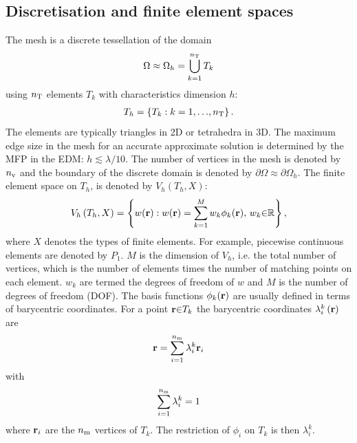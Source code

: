 \documentclass[a4paper]{article}
\numberwithin{equation}{section}
\begin{document}
\subsection[Discretisation and finite element spaces]{Discretisation and finite element spaces}
\label{sc:fem:discrete}

The mesh is a discrete tessellation of the domain
\begin{align}
\Omega \approx \Omega_h= \bigcup_{k=1}^{n_{\mathrm{T}}} T_k
\end{align}
using $n_{\mathrm{T}}$ elements $T_k$ with characteristics dimension $h$:
\begin{align}
T_h = \left\{T_k:k=1,{\dots},n_{\mathrm{T}}\right\}.
\end{align}
The elements are typically triangles in 2D or tetrahedra in 3D. The maximum edge size 
in the mesh for an accurate approximate solution is determined by the MFP in the EDM: $h\lesssim\lambda/10$.
The number of vertices in the mesh is denoted by $n_{\mathrm{v}}$ and the boundary of the
discrete domain is denoted by $\partial\Omega\approx\partial\Omega_h$. The finite element
space on $T_h$, is denoted by $V_h\left(T_h,X\right)$:
\begin{align}
V_h\left(T_h,X\right)=\left\{w(\boldsymbol{\mathrm{r}}):w(\boldsymbol{\mathrm{r}})=\sum_{k=1}^M w_k\phi_k(\boldsymbol{\mathrm{r}}),\,w_k{\in}\mathbb{R}\right\},
\end{align}
where $X$ denotes the types of finite elements. For example, piecewise continuous elements 
are denoted by $P_1$. $M$ is the dimension of $V_h$, i.e. the total number of vertices, 
which is the number of elements times the number of matching points on each 
element. $w_k$ are termed the degrees of freedom of $w$ and $M$ is the number 
of degrees of freedom (DOF). The basis functions $\phi_k(\boldsymbol{\mathrm{r}})$ are usually defined in terms 
of barycentric coordinates. For a point $\boldsymbol{\mathrm{r}}{\in}T_k$ the barycentric coordinates  
$\lambda_i^k\left(\boldsymbol{\mathrm{r}}\right)$ are
\begin{align}
\boldsymbol{\mathrm{r}} = \sum_{i=1}^{n_{\mathrm{m}}} \lambda_i^k \boldsymbol{\mathrm{r}}_i
\end{align}
with
\begin{equation*}
\sum_{i=1}^{n_{\mathrm{m}}} \lambda _i^k=1
\end{equation*}
where $\boldsymbol{\mathrm{r}}_i$ are the $n_{\mathrm{m}}$ vertices of $T_k$. {\color{red} The restriction of $\phi_i$ on $T_k$ is then $\lambda_i^k$.}
\end{document}
